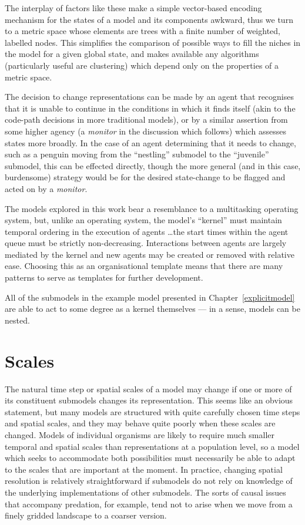 The interplay of factors like these make a simple vector-based
encoding mechanism for the states of a model and its components
awkward, thus we turn to a metric space whose elements are trees with
a finite number of weighted, labelled nodes. This simplifies the
comparison of possible ways to fill the niches in the model for a
given global state, and makes available any algorithms (particularly
useful are clustering) which depend only on the properties of a metric
space.

The decision to change representations can be made by an agent that
recognises that it is unable to continue in the conditions in which it
finds itself (akin to the code-path decisions in more traditional
models), or by a similar assertion from some higher agency
(a \emph{monitor\/} in the discussion which follows) which assesses
states more broadly.  In the case of an agent determining that it
needs to change, such as a penguin moving from the ``nestling''
submodel to the ``juvenile'' submodel, this can be effected directly,
though the more general (and in this case, burdensome) strategy would
be for the desired state-change to be flagged and acted on by
a \emph{monitor\/}.

The models explored in this work bear a resemblance to a multitasking
operating system, but, unlike an operating system, the model's ``kernel''
must maintain temporal ordering in the execution of agents \ldots the
start times within the agent queue must be strictly non-decreasing.
Interactions between agents are largely mediated by the kernel and
new agents may be created or removed with relative ease.  Choosing
this as an organisational template means that there are many patterns
to serve as templates for further development.

All of the submodels in the example model presented in
Chapter~\ref{explicitmodel} are able to act to some degree as a kernel
themselves --- in a sense, models can be nested.

\section{Scales}
The natural time step or spatial scales of a model may change if one
or more of its constituent submodels changes its representation.
This seems like an obvious statement, but many models are structured
with quite carefully chosen time steps and spatial scales, and they
may behave quite poorly when these scales are changed.  Models of
individual organisms are likely to require much smaller temporal and
spatial scales than representations at a population level, so a model
which seeks to accommodate both possibilities must necessarily be able
to adapt to the scales that are important at the moment.  In practice,
changing spatial resolution is relatively straightforward if submodels
do not rely on knowledge of the underlying implementations of other
submodels.  The sorts of causal issues that accompany predation, for
example, tend not to arise when we move from a finely gridded
landscape to a coarser version.

